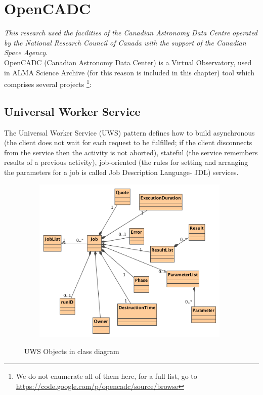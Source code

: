 \section{OpenCADC}

\textit{This research used the facilities of the Canadian Astronomy Data Centre operated 
by the National Research Council of Canada with the support of the Canadian Space Agency}.\\

OpenCADC (Canadian Astronomy Data Center) is a Virtual Observatory, used in ALMA Science Archive (for this reason is included in this chapter) tool which comprises several projects \footnote{We do not enumerate all of them here, for a full list, go to \url{https://code.google.com/p/opencadc/source/browse}}:

\subsection{Universal Worker Service}

The Universal Worker Service (UWS) pattern defines how to build asynchronous (the client does not wait for each request to be fulfilled; if the client disconnects from the service then the activity is not aborted), stateful (the service remembers results of a previous activity), job-oriented (the rules for setting and arranging the parameters for a job is called Job Description Language- JDL) services.

\begin{figure}[H]
\centering
\includegraphics[width=11cm,height=8cm]{images/Class_Diagram__UWS__UWSObjects.png}\\
\caption{UWS Objects in class diagram}
\end{figure}

